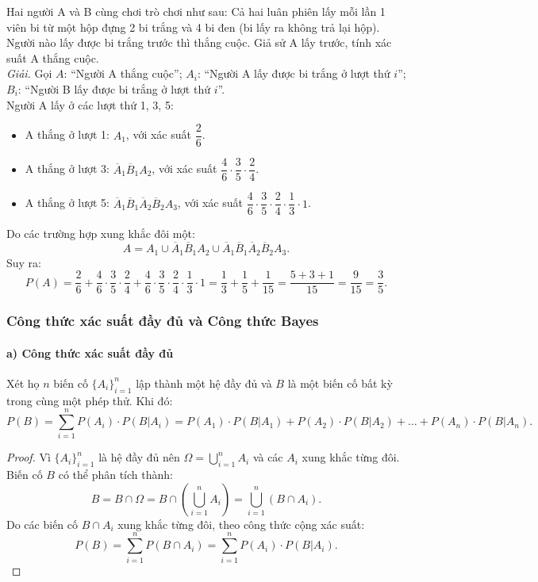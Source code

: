 \begin{vidu}
Hai người A và B cùng chơi trò chơi như sau: Cả hai luân phiên lấy mỗi lần 1 viên bi từ một hộp đựng 2 bi trắng và 4 bi đen (bi lấy ra không trả lại hộp). Người nào lấy được bi trắng trước thì thắng cuộc. Giả sử A lấy trước, tính xác suất A thắng cuộc.\\
\textit{Giải.} 
Gọi $A$: ``Người A thắng cuộc'';
$A_i$: ``Người A lấy được bi trắng ở lượt thứ $i$'';
$B_i$: ``Người B lấy được bi trắng ở lượt thứ $i$''.\\
Người A lấy ở các lượt thứ 1, 3, 5:
\begin{itemize}
    \item A thắng ở lượt 1: $A_1$, với xác suất $\dfrac{2}{6}$.
    \item A thắng ở lượt 3: $\overline{A}_1 \overline{B}_1 A_2$, với xác suất $\dfrac{4}{6} \cdot \dfrac{3}{5} \cdot \dfrac{2}{4}$.
    \item A thắng ở lượt 5: $\overline{A}_1 \overline{B}_1 \overline{A}_2 \overline{B}_2 A_3$, với xác suất $\dfrac{4}{6} \cdot \dfrac{3}{5} \cdot \dfrac{2}{4} \cdot \dfrac{1}{3} \cdot 1$.
\end{itemize}
Do các trường hợp xung khắc đôi một:
\[
A = A_1 \cup \overline{A}_1 \overline{B}_1 A_2 \cup \overline{A}_1 \overline{B}_1 \overline{A}_2 \overline{B}_2 A_3.
\]
Suy ra:
\[
P(A) = \frac{2}{6} + \frac{4}{6} \cdot \frac{3}{5} \cdot \frac{2}{4} + \frac{4}{6} \cdot \frac{3}{5} \cdot \frac{2}{4} \cdot \frac{1}{3} \cdot 1 = \frac{1}{3} + \frac{1}{5} + \frac{1}{15} = \frac{5 + 3 + 1}{15} = \frac{9}{15} = \frac{3}{5}.
\]
\end{vidu}

\subsubsection{Công thức xác suất đầy đủ và Công thức Bayes}

\paragraph{a) Công thức xác suất đầy đủ}
Xét họ $n$ biến cố $\{A_i\}_{i=1}^n$ lập thành một hệ đầy đủ và $B$ là một biến cố bất kỳ trong cùng một phép thử. Khi đó:
\[
P(B) = \sum_{i=1}^n P(A_i) \cdot P(B|A_i) = P(A_1) \cdot P(B|A_1) + P(A_2) \cdot P(B|A_2) + \dots + P(A_n) \cdot P(B|A_n).
\]

\begin{proof}
Vì $\{A_i\}_{i=1}^n$ là hệ đầy đủ nên $\Omega = \bigcup_{i=1}^n A_i$ và các $A_i$ xung khắc từng đôi.\\
Biến cố $B$ có thể phân tích thành:
\[
B = B \cap \Omega = B \cap \left(\bigcup_{i=1}^n A_i\right) = \bigcup_{i=1}^n (B \cap A_i).
\]
Do các biến cố $B \cap A_i$ xung khắc từng đôi, theo công thức cộng xác suất:
\[
P(B) = \sum_{i=1}^n P(B \cap A_i) = \sum_{i=1}^n P(A_i) \cdot P(B|A_i).
\]
\end{proof}

